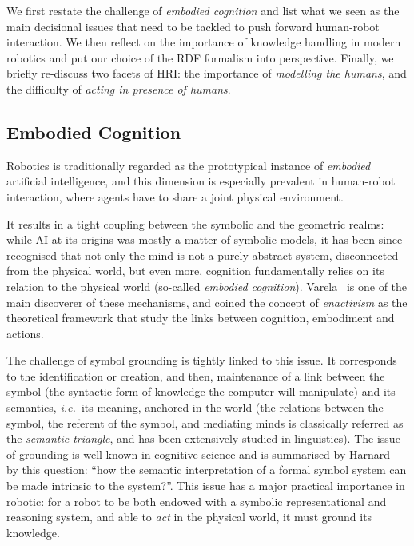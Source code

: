 \documentclass[preprint,3p,times]{elsarticle}
\newcommand{\ie}{{\textit{i.e.\ }}}
\begin{document}
We first restate the challenge of \emph{embodied cognition} and list what we
seen as the main decisional issues that need to be tackled to push forward
human-robot interaction. We then reflect on the importance of knowledge handling
in modern robotics and put our choice of the RDF formalism into perspective.
Finally, we briefly re-discuss two facets of HRI: the importance of
\emph{modelling the humans}, and the difficulty of \emph{acting in presence of
humans}.

\subsection{Embodied Cognition}

Robotics is traditionally regarded as the prototypical instance of \emph{embodied}
artificial intelligence, and this dimension is especially prevalent in
human-robot interaction, where agents have to share a joint physical
environment.

It results in a tight coupling between the symbolic and the geometric realms:
while AI at its origins was mostly a matter of symbolic models, it has been
since recognised that not only the mind is not a purely abstract system,
disconnected from the physical world, but even more, cognition fundamentally
relies on its relation to the physical world (so-called \emph{embodied
cognition}). Varela~\cite{Varela1992} is one of the main discoverer of these
mechanisms, and coined the concept of \emph{enactivism} as the theoretical
framework that study the links between cognition, embodiment and actions.

The challenge of symbol grounding is tightly linked to this issue. It
corresponds to the identification or creation, and then, maintenance of a link
between the symbol (the syntactic form of knowledge the computer will
manipulate) and its semantics, \ie its meaning, anchored in the world (the
relations between the symbol, the referent of the symbol, and mediating minds
is classically referred as the \emph{semantic triangle}, and has been
extensively studied in linguistics). The issue of grounding is well known in
cognitive science and is summarised by Harnard~\cite{Harnad1990} by this
question: ``how the semantic interpretation of a formal symbol system can be
made intrinsic to the system?''. This issue has a major practical importance in
robotic: for a robot to be both endowed with a symbolic representational and
reasoning system, and able to \emph{act} in the physical world, it must ground
its knowledge.
\end{document}

